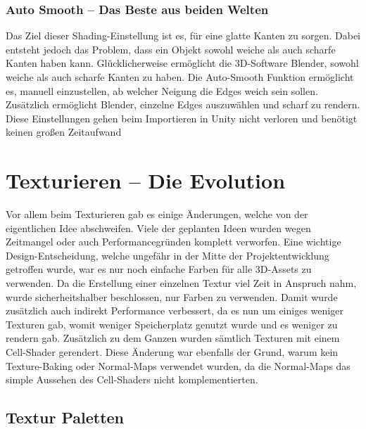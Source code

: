 \subsubsection{Auto Smooth – Das Beste aus beiden Welten}

Das Ziel dieser Shading-Einstellung ist es, für eine glatte Kanten zu sorgen. Dabei entsteht jedoch das Problem, dass ein Objekt sowohl weiche als auch scharfe Kanten haben kann. Glücklicherweise ermöglicht die 3D-Software Blender, sowohl weiche als auch scharfe Kanten zu haben. Die Auto-Smooth Funktion ermöglicht es, manuell einzustellen, ab welcher Neigung die Edges weich sein sollen. 
Zusätzlich ermöglicht Blender, einzelne Edges auszuwählen und scharf zu rendern. Diese Einstellungen gehen beim Importieren in Unity nicht verloren und benötigt keinen großen Zeitaufwand

\section{Texturieren – Die Evolution}

Vor allem beim Texturieren gab es einige Änderungen, welche von der eigentlichen Idee abschweifen. Viele der geplanten Ideen wurden wegen Zeitmangel oder auch Performancegründen komplett verworfen. Eine wichtige Design-Entscheidung, welche ungefähr in der Mitte der Projektentwicklung getroffen wurde, war es nur noch einfache Farben für alle 3D-Assets zu verwenden. Da die Erstellung einer einzelnen Textur viel Zeit in Anspruch nahm, wurde sicherheitshalber beschlossen, nur Farben zu verwenden. Damit wurde zusätzlich auch indirekt Performance verbessert, da es nun um einiges weniger Texturen gab, womit weniger Speicherplatz genutzt wurde und es weniger zu rendern gab. Zusätzlich zu dem Ganzen wurden sämtlich Texturen mit einem Cell-Shader gerendert.
Diese Änderung war ebenfalls der Grund, warum kein Texture-Baking oder Normal-Maps verwendet wurden, da die Normal-Maps das simple Aussehen des Cell-Shaders nicht komplementierten.

\subsection{Textur Paletten}

